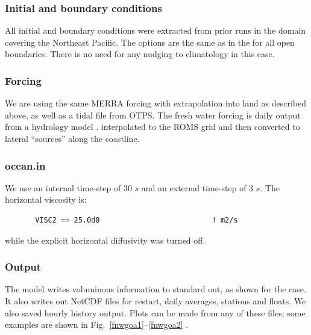 \subsubsection{Initial and boundary conditions}
All initial and boundary conditions were extracted from prior runs
in the  domain covering the Northeast Pacific. The
 options are the same as in the  for all
open boundaries. There is no need for any nudging to climatology
in this case.

\subsubsection{Forcing}
We are using the same MERRA forcing with extrapolation into land as
described above, as well as a tidal file from OTPS. The fresh water
forcing is daily output from a hydrology model \citep{Beamer_2016},
interpolated to the ROMS grid and then converted to lateral ``sources''
along the coastline.

\subsubsection{ocean.in}
We use an internal time-step of 30 $s$ and an external time-step of
3 $s$. The horizontal viscosity is:
\begin{verbatim}
       VISC2 == 25.0d0                          ! m2/s
\end{verbatim}
while the explicit horizontal diffusivity was turned off.

\subsubsection{Output}
The model writes voluminous information to standard out, as shown
for the  case. It also writes out NetCDF files for
restart, daily averages, stations and floats. We also saved hourly
history output. Plots can be made from any of these files; some
examples are shown in Fig.\ \ref{fnwgoa1}--\ref{fnwgoa2} .

